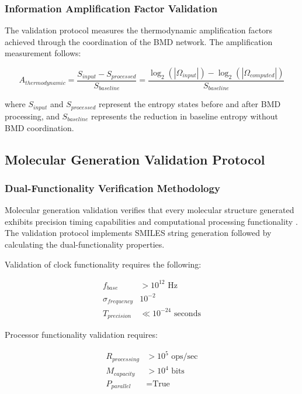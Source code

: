 \documentclass[12pt,a4paper]{article}
\begin{document}
\subsubsection{Information Amplification Factor Validation}

The validation protocol measures the thermodynamic amplification factors achieved through the coordination of the BMD network. The amplification measurement follows:

\begin{equation}
A_{thermodynamic} = \frac{S_{input} - S_{processed}}{S_{baseline}} = \frac{\log_2(|\Omega_{input}|) - \log_2(|\Omega_{computed}|)}{S_{baseline}}
\end{equation}

where $S_{input}$ and $S_{processed}$ represent the entropy states before and after BMD processing, and $S_{baseline}$ represents the reduction in baseline entropy without BMD coordination.

\subsection{Molecular Generation Validation Protocol}

\subsubsection{Dual-Functionality Verification Methodology}

Molecular generation validation verifies that every molecular structure generated exhibits precision timing capabilities and computational processing functionality \cite{lloyd2000ultimate}. The validation protocol implements SMILES string generation followed by calculating the dual-functionality properties.

Validation of clock functionality requires the following:

\begin{align}
f_{base} &> 10^{12} \text{ Hz} \\
\sigma_{frequency} & 10^{-2} \\
T_{precision} &\ll 10^{-24} \text{ seconds}
\end{align}

Processor functionality validation requires:

\begin{align}
R_{processing} &> 10^{5} \text{ ops/sec} \\
M_{capacity} &> 10^{4} \text{ bits} \\
P_{parallel} &= \text{True}
\end{align}
\end{document}
